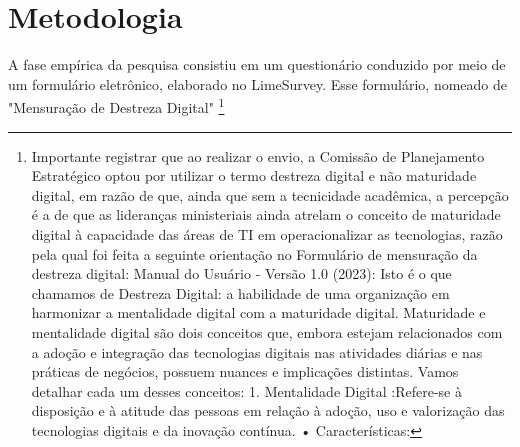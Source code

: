 \section{Metodologia}

A fase empírica da pesquisa consistiu em um questionário conduzido por meio de um formulário eletrônico, elaborado no LimeSurvey. Esse formulário, nomeado de "Mensuração de Destreza Digital" \footnote{Importante registrar que ao realizar o envio, a Comissão de Planejamento Estratégico optou por utilizar o termo destreza digital e não maturidade digital, em razão de que, ainda que sem a tecnicidade acadêmica, a percepção é a de que as lideranças ministeriais ainda atrelam o conceito de maturidade digital à capacidade das áreas de TI em operacionalizar as tecnologias, razão pela qual foi feita a seguinte orientação no Formulário de mensuração da destreza digital: Manual do Usuário - Versão 1.0 (2023): Isto é o que chamamos de Destreza Digital: a habilidade de uma organização em harmonizar a mentalidade digital com a maturidade digital. Maturidade e mentalidade digital são dois conceitos que, embora estejam relacionados com a adoção e integração das tecnologias digitais nas atividades diárias e nas práticas de negócios, possuem nuances e implicações distintas. Vamos detalhar cada um desses conceitos: 1. Mentalidade Digital :Refere-se à disposição e à atitude das pessoas em relação à adoção, uso e valorização das tecnologias digitais e da inovação contínua. • Características:
}
